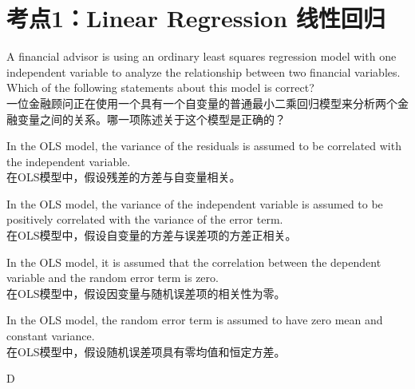 \documentclass{article}
\newcounter{question} %
\begin{document}
 \tableofcontents %
\newpage






\section{考点1：Linear Regression 线性回归}
\setcounter{question}{0}

\begin{question}
A financial advisor is using an ordinary least squares regression model with one independent variable to analyze the relationship between two financial variables. Which of the following statements about this model is correct?\\
一位金融顾问正在使用一个具有一个自变量的普通最小二乘回归模型来分析两个金融变量之间的关系。哪一项陈述关于这个模型是正确的？
\end{question}

\begin{choices}
    \item In the OLS model, the variance of the residuals is assumed to be correlated with the independent variable.\\
    在OLS模型中，假设残差的方差与自变量相关。
    \item In the OLS model, the variance of the independent variable is assumed to be positively correlated with the variance of the error term.\\
    在OLS模型中，假设自变量的方差与误差项的方差正相关。
    \item In the OLS model, it is assumed that the correlation between the dependent variable and the random error term is zero.\\
    在OLS模型中，假设因变量与随机误差项的相关性为零。
    \item In the OLS model, the random error term is assumed to have zero mean and constant variance.\\
    在OLS模型中，假设随机误差项具有零均值和恒定方差。
\end{choices}

\begin{correctanswer}
    D
\end{correctanswer}
\end{document}
